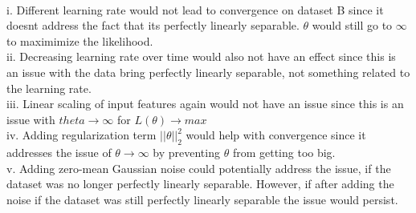 \begin{answer}\\
i. Different learning rate would not lead to convergence on dataset B since it doesnt address the fact that its perfectly linearly separable. $\theta$ would still go to $\infty$ to maximimize the likelihood.\\
ii. Decreasing learning rate over time would also not have an effect since this is an issue with the data bring perfectly linearly separable, not something related to the learning rate.\\
iii. Linear scaling of input features  again would not have an issue since this is an issue with $theta \rightarrow \infty$ for $L(\theta) \rightarrow max$\\
iv. Adding regularization term $||\theta||_2^2$ would help with convergence since it addresses the issue of $\theta \rightarrow \infty$ by preventing $\theta$ from getting too big.\\
v. Adding zero-mean Gaussian noise could potentially address the issue, if the dataset was no longer perfectly linearly separable. However, if after adding the noise if the dataset was still perfectly linearly separable the issue would persist.\\
\end{answer}
